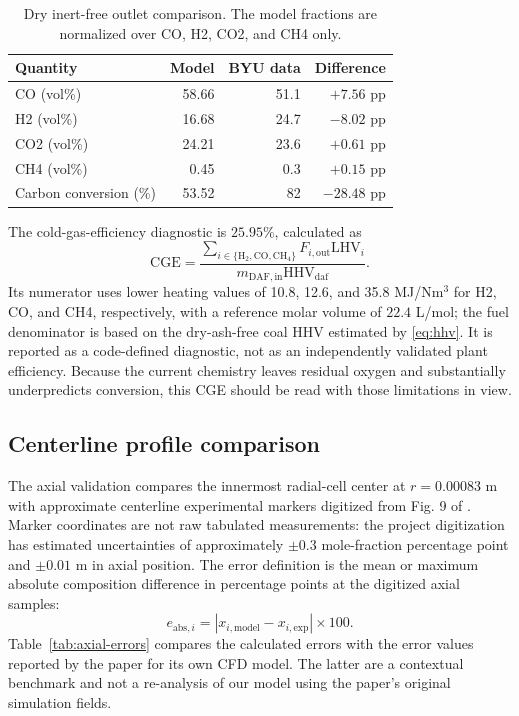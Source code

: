\documentclass[journal]{IEEEtran}
\newcommand{\CO}{\mathrm{CO}}
\newcommand{\Htwo}{\mathrm{H_2}}
\newcommand{\CHfour}{\mathrm{CH_4}}
\newcommand{\daf}{\mathrm{daf}}
\begin{document}
\begin{table}[t]
\caption{Dry inert-free outlet comparison. The model fractions are normalized over CO, H2, CO2, and CH4 only.}
\label{tab:outlet-comparison}
\centering
\footnotesize
\begin{tabular}{lrrr}
\toprule
Quantity & Model & BYU data & Difference\\
\midrule
CO (vol\%) & 58.66 & 51.1 & \(+7.56\) pp\\
H2 (vol\%) & 16.68 & 24.7 & \(-8.02\) pp\\
CO2 (vol\%) & 24.21 & 23.6 & \(+0.61\) pp\\
CH4 (vol\%) & 0.45 & 0.3 & \(+0.15\) pp\\
Carbon conversion (\%) & 53.52 & 82 & \(-28.48\) pp\\
\bottomrule
\end{tabular}
\end{table}

The cold-gas-efficiency diagnostic is \(25.95\%\), calculated as
\begin{equation}
\mathrm{CGE}=\frac{\sum_{i\in\{\Htwo,\CO,\CHfour\}}F_{i,\mathrm{out}}\mathrm{LHV}_i}
{m_{\mathrm{DAF,in}}\mathrm{HHV}_{\daf}}.
\end{equation}
Its numerator uses lower heating values of 10.8, 12.6, and 35.8 MJ/Nm\(^3\) for H2, CO, and CH4, respectively, with a reference molar volume of \(22.4\) L/mol; the fuel denominator is based on the dry-ash-free coal HHV estimated by \eqref{eq:hhv}. It is reported as a code-defined diagnostic, not as an independently validated plant efficiency. Because the current chemistry leaves residual oxygen and substantially underpredicts conversion, this CGE should be read with those limitations in view.

\subsection{Centerline profile comparison}
The axial validation compares the innermost radial-cell center at \(r=0.00083\) m with approximate centerline experimental markers digitized from Fig. 9 of \cite{mularski2021}. Marker coordinates are not raw tabulated measurements: the project digitization has estimated uncertainties of approximately \(\pm0.3\) mole-fraction percentage point and \(\pm0.01\) m in axial position. The error definition is the mean or maximum absolute composition difference in percentage points at the digitized axial samples:
\begin{equation}
e_{\mathrm{abs},i} = |x_{i,\mathrm{model}}-x_{i,\mathrm{exp}}|\times100.
\end{equation}
Table~\ref{tab:axial-errors} compares the calculated errors with the error values reported by the paper for its own CFD model. The latter are a contextual benchmark and not a re-analysis of our model using the paper's original simulation fields.
\end{document}
